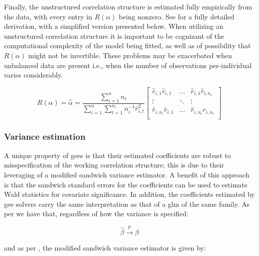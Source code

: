 \documentclass{report}
\begin{document}
Finally, the unstructured correlation structure is estimated fully empirically from the data, with every entry in $R(\alpha)$ being nonzero. See \cite[Chapter~3.2.1]{hardin_generalized_2012} for a fully detailed derivation, with a simplified version presented below. When utilizing an unstructured correlation structure it is important to be cognizant of the computational complexity of the model being fitted, as well as of possibility that $R(\alpha)$ might not be invertible. These problems may be exacerbated when unbalanced data are present i.e., when the number of observations per-individual varies considerably. 

\begin{equation}\label{eq:glm-gee-alpha-unstructured}
    R(\alpha) = \hat{\alpha} = \frac{\sum_{i=1}^n n_i}{\sum_{i=1}^n\sum_{t=1}^{n_i} n_i^{-1}\hat{r}^2_{i,t}} \begin{bmatrix}
        \hat{r}_{i,1}\hat{r}_{i,1} & \dots & \hat{r}_{i,1}\hat{r}_{i,n_i} \\
        \vdots & \ddots & \vdots \\
        \hat{r}_{i, n_i}\hat{r}_{i,1} & \dots & \hat{r}_{i,n_i}\hat{r}_{i,n_i} \\ 
    \end{bmatrix}
\end{equation}

\subsubsection{Variance estimation}

A unique property of \glspl{gee} is that their estimated coefficients are robust to misspecification of the working correlation structure; this is due to their leveraging of a modified sandwich variance estimator. A benefit of this approach is that the sandwich standard errors for the coefficients can be used to estimate Wald statistics for covariate significance. In addition, the coefficients estimated by \gls{gee} solvers carry the same interpretation as that of a \gls{glm} of the same family. As per \cite[Chapter~13.5]{faraway_extending_2016} we have that, regardless of how the variance is specified:

\begin{equation}\label{eq:glm-gee-beta-asymptotics-1}
    \hat{\beta} \overset{p}{\to} \beta
\end{equation}

and as per \cite[Chapter~3]{hardin_generalized_2012}, the modified sandwich variance estimator is given by:
\end{document}
